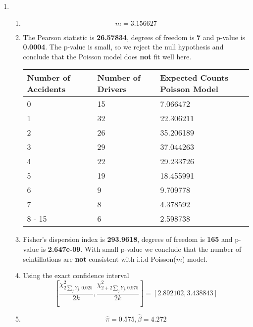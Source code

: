 \documentclass{article}
\begin{document}
\begin{enumerate}[leftmargin = 0 em, label = \arabic*., font = \bfseries]
\begin{enumerate}
	\end{enumerate}

	\item 
	\begin{enumerate}
		\item 
		\[\hat{m} = 3.156627\]

		\item The Pearson statistic is \textbf{ 26.57834}, degrees of freedom is \textbf{7} and p-value is \textbf{0.0004}. The p-value is small, so we reject the null hypothesis and conclude that the Poisson model does \textbf{not} fit well here. 
		\begin{center}
			\begin{tabularx}{0.8\textwidth}{p{0.3\textwidth}p{}X}
      	\toprule
			\textbf{Number of Accidents} & \textbf{Number of Drivers}&\textbf{Expected Counts Poisson Model}\\
			\midrule		
        0&   15&  7.066472\\
        1&   32& 22.306211\\
        2&   26& 35.206189\\
        3&   29& 37.044263\\
        4&   22& 29.233726\\
        5&   19& 18.455991\\
        6&    9&  9.709778\\
        7&    8&  4.378592\\
       8 - 15&    6&  2.598738\\
       \bottomrule
      			\end{tabularx}
		\end{center}

		\item 
		Fisher's dispersion index is \textbf{293.9618}, degrees of freedom is \textbf{165} and p-value is \textbf{ 2.647e-09}. With small p-value we conclude that the number of scintillations are \textbf{not} consistent with i.i.d Poisson($m$) model.


		\item 
		Using the exact confidence interval
		\[\left[\frac{\chi_{2 \sum_{j}Y_j, 0.025}^2}{2k} , \frac{\chi_{2 + 2 \sum_{j} Y_j, 0.975}^2}{2k}\right] = [2.892102 , 3.438843]\]

		\item 
		\[\hat{\pi} = 0.575, \hat{\beta} =  4.272\]


\end{enumerate}
\end{enumerate}
\end{document}
